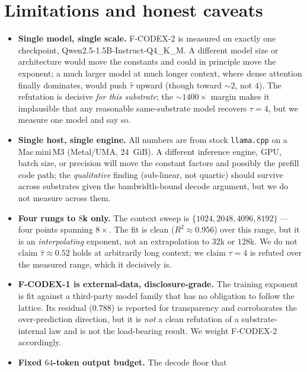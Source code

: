 \documentclass[11pt,a4paper]{article}
\newcommand{\taum}{\ensuremath{\hat{\tau}}}
\begin{document}
\section{Limitations and honest caveats}
\label{sec:limits}

\begin{itemize}
  \item \textbf{Single model, single scale.} F-CODEX-2 is measured on exactly
    one checkpoint, Qwen2.5-1.5B-Instruct-Q4\_K\_M. A different model size or
    architecture would move the constants and could in principle move the
    exponent; a much larger model at much longer context, where dense attention
    finally dominates, would push \(\taum\) upward (though toward \(\sim\!2\),
    not \(4\)). The refutation is decisive \emph{for this substrate}; the
    \(\sim\!1400\times\) margin makes it implausible that any reasonable
    same-substrate model recovers \(\tau = 4\), but we measure one model and say
    so.
  \item \textbf{Single host, single engine.} All numbers are from stock
    \texttt{llama.cpp} on a Mac\,mini\,M3 (Metal/UMA, \SI{24}{GiB}). A different
    inference engine, GPU, batch size, or precision will move the constant
    factors and possibly the prefill code path; the \emph{qualitative} finding
    (sub-linear, not quartic) should survive across substrates given the
    bandwidth-bound decode argument, but we do not measure across them.
  \item \textbf{Four rungs to \(8\)k only.} The context sweep is
    \(\{1024, 2048, 4096, 8192\}\) --- four points spanning \(8\times\). The fit
    is clean (\(R^2 \approx 0.956\)) over this range, but it is an
    \emph{interpolating} exponent, not an extrapolation to \(32\)k or \(128\)k.
    We do not claim \(\taum \approx 0.52\) holds at arbitrarily long context;
    we claim \(\tau = 4\) is refuted over the measured range, which it
    decisively is.
  \item \textbf{F-CODEX-1 is external-data, disclosure-grade.} The training
    exponent is fit against a third-party model family that has no obligation to
    follow the lattice. Its residual (\(0.788\)) is reported for transparency
    and corroborates the over-prediction direction, but it is \emph{not} a clean
    refutation of a substrate-internal law and is not the load-bearing result.
    We weight F-CODEX-2 accordingly.
  \item \textbf{Fixed \(64\)-token output budget.} The decode floor that

\end{itemize}
\end{document}
